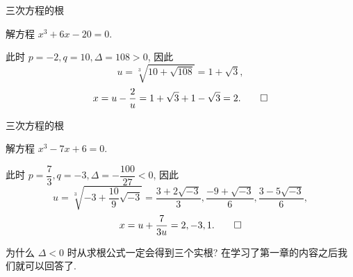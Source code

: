 \begin{frame}{三次方程的根}
\begin{example}
解方程 $x^3+6x-20=0$.
\end{example}
\begin{solution}
此时 $p=-2,q=10,\Delta=108>0$,
\onslide<+->
因此
\[u=\sqrt[3]{10+\sqrt{108}}=1+\sqrt 3,\]
\vspace{-\baselineskip}
\onslide<+->
\[x=u-\frac 2u=1+\sqrt 3+1-\sqrt 3=2.\qedhere\]
\end{solution}
\end{frame}


\begin{frame}{三次方程的根}
\begin{example}
解方程 $x^3-7x+6=0$.
\end{example}
\begin{solution}
此时 $p=\dfrac73,q=-3,\Delta=-\dfrac{100}{27}<0$,
\onslide<+->
因此
\[u=\sqrt[3]{-3+\frac{10}9\sqrt{-3}}
=\frac{3+2\sqrt{-3}}3,\frac{-9+\sqrt{-3}}6,\frac{3-5\sqrt{-3}}6,\]
\vspace{-\baselineskip}
\onslide<+->
\[x=u+\frac 7{3u}=2,-3,1.\qedhere\]
\end{solution}

\onslide<+->
为什么 $\Delta<0$ 时从求根公式一定会得到三个实根?
\onslide<+->
在学习了第一章的内容之后我们就可以回答了.
\end{frame}


